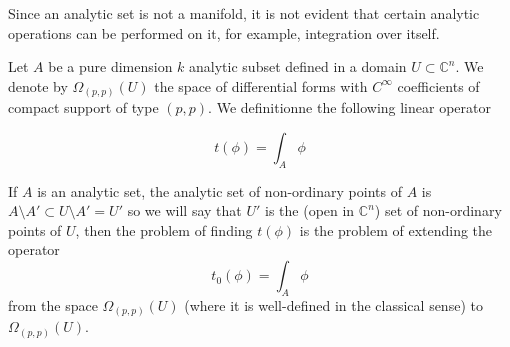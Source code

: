 \documentclass[12pt,twoside,a4paper]{report}
\newcommand{\om}{\ensuremath{\Omega}}
\begin{document}
Since an analytic set is not a manifold, it is not evident that certain analytic operations can be performed on it, for example, integration over itself.

Let $A$ be a pure dimension $k$ analytic subset defined in a domain $U\subset\mathbb{C}^n$. We denote by $\om_{(p,p)}(U)$ the space of differential forms with $C^{\infty}$ coefficients of compact support of type $(p,p)$. We definitionne the following linear operator

\[
    t(\phi)=\int_{A}\phi
\]

If $A$ is an analytic set, the analytic set of non-ordinary points of $A$ is $A\setminus A'\subset U\setminus A'=U'$ so we will say that $U'$ is the (open in $\mathbb{C}^n$) set of non-ordinary points of $U$, then the problem of finding $t(\phi)$ is the problem of extending the operator
\[
    t_0(\phi)=\int_{A}\phi
\]
from the space $\om_{(p,p)}(U)$ (where it is well-defined in the classical sense) to $\om_{(p,p)}(U)$.
\end{document}
